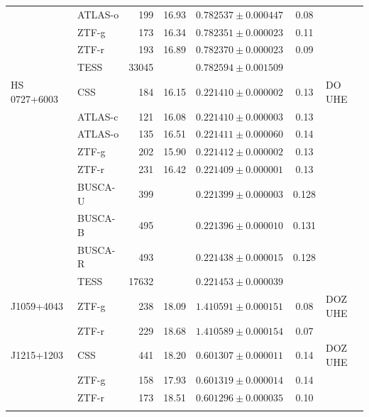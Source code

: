 \documentclass{aa}
\begin{document}
\begin{appendix}
\begin{table}
\begin{tabular}{l l r r c c l}
              &           ATLAS-o             &           199        & 16.93 & $0.782537\pm0.000447$ & 0.08 &\\
              & ZTF-g   &       173     & 16.34 & $0.782351\pm0.000023$ & 0.11 &  \\
              & ZTF-r   &       193     & 16.89 & $0.782370\pm0.000023$ & 0.09 &  \\
              &           TESS      &           33045   &           & $0.782594\pm0.001509$ &        &\\
\noalign{\smallskip}                                                
HS\,0727+6003&            CSS        &           184        & 16.15 & $0.221410\pm0.000002$ &       0.13 &DO UHE \\
              &           ATLAS-c              &           121        & 16.08 & $0.221410\pm0.000003$ &       0.13 & \\
              &           ATLAS-o             &           135        & 16.51 & $0.221411\pm0.000060$ & 0.14 & \\
               & ZTF-g  &       202     & 15.90 & $0.221412\pm0.000002$ & 0.13 &  \\
               & ZTF-r  &       231     & 16.42 & $0.221409\pm0.000001$ & 0.13 &  \\
              &           BUSCA-U            &           399        &           & $0.221399\pm0.000003$ &       0.128 & \\
              &           BUSCA-B            &           495        &           & $0.221396\pm0.000010$ &       0.131 & \\
              &           BUSCA-R            &           493        &           & $0.221438\pm0.000015$ &       0.128 & \\
        &   TESS      &           17632   &           & $0.221453\pm0.000039$ &         & \\
\noalign{\smallskip}
J1059+4043 & ZTF-g  & 238  & 18.09 & $1.410591\pm0.000151$ & 0.08 & DOZ UHE \\
           & ZTF-r  & 229  & 18.68 & $1.410589\pm0.000154$ & 0.07 &  \\
\noalign{\smallskip}
J1215+1203&    CSS        & 441  & 18.20  & $0.601307\pm0.000011$ & 0.14 & DOZ UHE\\
               & ZTF-g  & 158  & 17.93  & $0.601319\pm0.000014$ & 0.14 &  \\
               & ZTF-r  & 173  & 18.51  & $0.601296\pm0.000035$ & 0.10 &  \\
\noalign{\smallskip}                            

\end{tabular}
\end{table}
\end{appendix}
\end{document}
